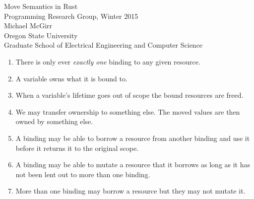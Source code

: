 \documentclass[10pt]{article}
\begin{document}
\vspace{2.0cm}

\begin{center}
    {\huge Move Semantics in Rust} 
    \vspace{0.1in} \\
    {\large Programming Research Group, Winter 2015} 
    \vspace{0.1in} \\
    {\large Michael McGirr} 
    \vspace{0.1in} \\
    {\large Oregon State University} 
    \vspace{0.1in} \\
    {\large Graduate School of Electrical Engineering and Computer Science}  
\end{center}

\vspace{1.0cm}

\begin{enumerate}
    \item There is only ever \textit{exactly one} binding to any given resource.

    \item A variable owns what it is bound to.

    \item When a variable's lifetime goes out of scope the bound resources are freed.

    \item We may transfer ownership to something else. The moved values are then
          owned by something else.

    \item A binding may be able to borrow a resource from another binding and
          use it before it returns it to the original scope.

    \item A binding may be able to mutate a resource that it borrows as long as
          it has not been lent out to more than one binding.

    \item More than one binding may borrow a resource but they may not mutate it.


\end{enumerate}
\end{document}
